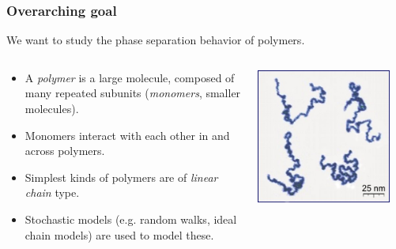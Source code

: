 \begin{frame}
        \titlepage
\end{frame}

\begin{frame}[t]
    \frametitle{Overarching goal}

    We want to study the phase separation behavior of polymers.

    \vfill

    \begin{columns}
        \begin{column}{0.6\textwidth}
            \begin{itemize}
                \item A \emph{polymer} is a large molecule, composed of many repeated subunits (\emph{monomers}, smaller molecules).
                \item Monomers interact with each other in and across polymers.
                \item {} Simplest kinds of polymers are of \emph{linear chain} type.
                \item Stochastic models (e.g. random walks, ideal chain models) are used to model these.
            \end{itemize}
        \end{column}
        \begin{column}{0.4\textwidth}
            \centering
            \includegraphics[width=0.9\textwidth]{figures/Single_Polymer_Chains_AFM.jpg}
        \end{column}
    \end{columns}
\end{frame}

